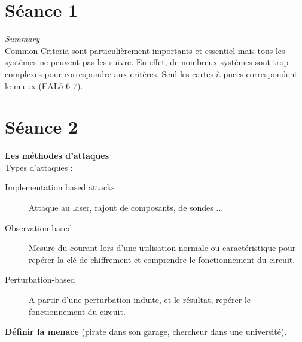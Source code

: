 \documentclass[a4paper,12pt]{article}
\begin{document}
\section{Séance 1}
\textit{Summary}\\
Common Criteria sont particulièrement importants et essentiel mais tous les systèmes ne peuvent pas les suivre. En effet, de nombreux systèmes sont trop complexes pour correspondre aux critères. Seul les cartes à puces correspondent le mieux (EAL5-6-7).

\section{Séance 2}
\large{\textbf{Les méthodes d'attaques}}\\
\normalsize
Types d'attaques :
\begin{description}
\item[Implementation based attacks] Attaque au laser, rajout de composants, de sondes ... 
\item[Observation-based] Mesure du courant lors d'une utilisation normale ou caractéristique pour repérer la clé de chiffrement et comprendre le fonctionnement du circuit.
\item[Perturbation-based] A partir d'une perturbation induite, et le résultat, repérer le fonctionnement du circuit.\\
\end{description}

\textbf{Définir la menace} (pirate dans son garage, chercheur dans une université).
\end{document}
